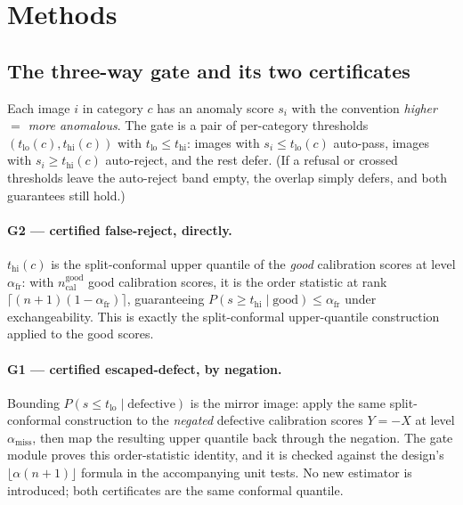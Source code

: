 \documentclass[preprint,11pt]{elsarticle}
\begin{document}
\section{Methods}
\label{sec:methods}

\subsection{The three-way gate and its two certificates}
\label{sec:gate}

Each image $i$ in category $c$ has an anomaly score $s_i$ with the convention \emph{higher
$=$ more anomalous}. The gate is a pair of per-category thresholds $(t_{\text{lo}}(c),
t_{\text{hi}}(c))$ with $t_{\text{lo}} \le t_{\text{hi}}$: images with $s_i \le t_{\text{lo}}(c)$
auto-pass, images with $s_i \ge t_{\text{hi}}(c)$ auto-reject, and the rest defer. (If a refusal or
crossed thresholds leave the auto-reject band empty, the overlap simply defers, and both guarantees
still hold.)

\paragraph{G2 --- certified false-reject, directly.} $t_{\text{hi}}(c)$ is the split-conformal
upper quantile of the \emph{good} calibration scores at level $\alpha_{\text{fr}}$: with
$n_{\text{cal}}^{\text{good}}$ good calibration scores, it is the order statistic at rank
$\lceil (n+1)(1-\alpha_{\text{fr}}) \rceil$, guaranteeing $P(s \ge t_{\text{hi}} \mid \text{good})
\le \alpha_{\text{fr}}$ under exchangeability. This is exactly the split-conformal upper-quantile
construction applied to the good scores.

\paragraph{G1 --- certified escaped-defect, by negation.} Bounding
$P(s \le t_{\text{lo}} \mid \text{defective})$ is the mirror image: apply the same split-conformal
construction to the \emph{negated} defective calibration scores $Y=-X$ at level
$\alpha_{\text{miss}}$, then map the resulting upper quantile back through the negation. The gate
module proves this order-statistic identity, and it is checked against the design's
$\lfloor \alpha(n+1)\rfloor$ formula in the accompanying unit tests. No new
estimator is introduced; both certificates are the same conformal quantile.
\end{document}
